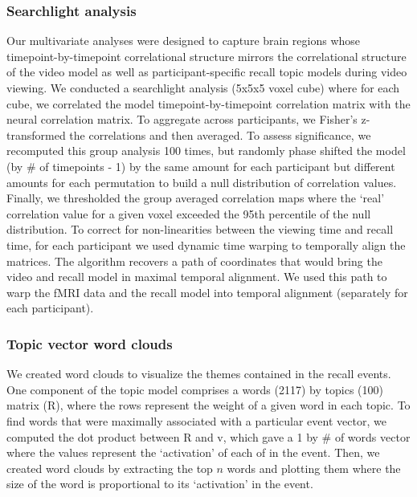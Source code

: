 \documentclass{article}
\begin{document}
\subsubsection{Searchlight analysis}
Our multivariate analyses were designed to capture brain regions whose timepoint-by-timepoint correlational structure mirrors the correlational structure of the video model as well as participant-specific recall topic models during video viewing. We conducted a searchlight analysis (5x5x5 voxel cube) where for each cube, we correlated the model timepoint-by-timepoint correlation matrix with the neural correlation matrix. To aggregate across participants, we Fisher's z-transformed the correlations and then averaged.  To assess significance, we recomputed this group analysis 100 times, but randomly phase shifted the model (by \# of timepoints - 1) by the same amount for each participant but different amounts for each permutation to build a null distribution of correlation values. Finally, we thresholded the group averaged correlation maps where the `real' correlation value for a given voxel exceeded the 95th percentile of the null distribution. To correct for non-linearities between the viewing time and recall time, for each participant we used dynamic time warping to temporally align the matrices. The algorithm recovers a path of coordinates that would bring the video and recall model in maximal temporal alignment. We used this path to warp the fMRI data and the recall model into temporal alignment (separately for each participant).

\subsubsection{Topic vector word clouds}
We created word clouds to visualize the themes contained in the recall events. One component of the topic model comprises a words (2117) by topics (100) matrix (R), where the rows represent the weight of a given word in each topic.  To find words that were maximally associated with a particular event vector, we computed the dot product between R and v, which gave a 1 by \# of words vector where the values represent the `activation' of each of in the event. Then, we created word clouds by extracting the top $n$ words and plotting them where the size of the word is proportional to its `activation' in the event.
\end{document}
